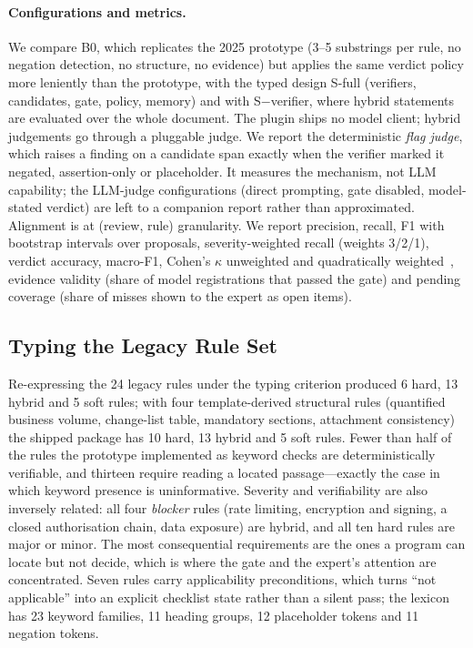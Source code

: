 \documentclass{IOS-Book-Article}
\begin{document}
\paragraph{Configurations and metrics.}
We compare B0, which replicates the 2025 prototype (3--5 substrings per rule, no negation detection, no structure, no evidence) but applies the same verdict policy more leniently than the prototype, with the typed design S-full (verifiers, candidates, gate, policy, memory) and with S$-$verifier, where hybrid statements are evaluated over the whole document. The plugin ships no model client; hybrid judgements go through a pluggable judge. We report the deterministic \emph{flag judge}, which raises a finding on a candidate span exactly when the verifier marked it negated, assertion-only or placeholder. It measures the mechanism, not LLM capability; the LLM-judge configurations (direct prompting, gate disabled, model-stated verdict) are left to a companion report rather than approximated. Alignment is at (review, rule) granularity. We report precision, recall, F1 with bootstrap intervals over proposals, severity-weighted recall (weights 3/2/1), verdict accuracy, macro-F1, Cohen's $\kappa$ unweighted and quadratically weighted~\cite{cohen1960,landis1977}, evidence validity (share of model registrations that passed the gate) and pending coverage (share of misses shown to the expert as open items).

\subsection{Typing the Legacy Rule Set}

Re-expressing the 24 legacy rules under the typing criterion produced 6 hard, 13 hybrid and 5 soft rules; with four template-derived structural rules (quantified business volume, change-list table, mandatory sections, attachment consistency) the shipped package has 10 hard, 13 hybrid and 5 soft rules. Fewer than half of the rules the prototype implemented as keyword checks are deterministically verifiable, and thirteen require reading a located passage---exactly the case in which keyword presence is uninformative. Severity and verifiability are also inversely related: all four \emph{blocker} rules (rate limiting, encryption and signing, a closed authorisation chain, data exposure) are hybrid, and all ten hard rules are major or minor. The most consequential requirements are the ones a program can locate but not decide, which is where the gate and the expert's attention are concentrated. Seven rules carry applicability preconditions, which turns ``not applicable'' into an explicit checklist state rather than a silent pass; the lexicon has 23 keyword families, 11 heading groups, 12 placeholder tokens and 11 negation tokens.
\end{document}
